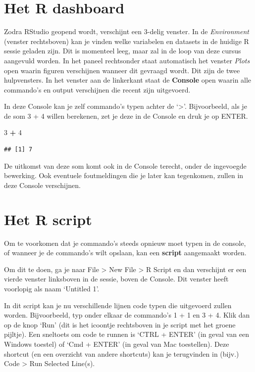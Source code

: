 \documentclass[
]{book}
\newenvironment{Shaded}{\begin{snugshade}}{\end{snugshade}}
\newcommand{\DecValTok}[1]{\textcolor[rgb]{0.00,0.00,0.81}{#1}}
\newcommand{\SpecialCharTok}[1]{\textcolor[rgb]{0.81,0.36,0.00}{\textbf{#1}}}
\begin{document}
\hypertarget{het-r-dashboard}{%
\section{Het R dashboard}\label{het-r-dashboard}}

Zodra RStudio geopend wordt, verschijnt een 3-delig venster. In de \emph{Environment} (venster rechtsboven) kan je vinden welke variabelen en datasets in de huidige R sessie geladen zijn. Dit is momenteel leeg, maar zal in de loop van deze cursus aangevuld worden. In het paneel rechtsonder staat automatisch het venster \emph{Plots} open waarin figuren verschijnen wanneer dit gevraagd wordt. Dit zijn de twee hulpvensters. In het venster aan de linkerkant staat de \textbf{Console} open waarin alle commando's en output verschijnen die recent zijn uitgevoerd.

In deze Console kan je zelf commando's typen achter de `\textgreater{}'. Bijvoorbeeld, als je de som 3 + 4 willen berekenen, zet je deze in de Console en druk je op ENTER.

\begin{Shaded}
\begin{Highlighting}[]
\DecValTok{3} \SpecialCharTok{+} \DecValTok{4}
\end{Highlighting}
\end{Shaded}

\begin{verbatim}
## [1] 7
\end{verbatim}

De uitkomst van deze som komt ook in de Console terecht, onder de ingevoegde bewerking. Ook eventuele foutmeldingen die je later kan tegenkomen, zullen in deze Console verschijnen.

\hypertarget{het-r-script}{%
\section{Het R script}\label{het-r-script}}

Om te voorkomen dat je commando's steeds opnieuw moet typen in de console, of
wanneer je de commando's wilt opslaan, kan een \textbf{script} aangemaakt worden.

Om dit te doen, ga je naar File \textgreater{} New File \textgreater{} R Script en dan verschijnt er een vierde
venster linksboven in de sessie, boven de Console. Dit venster heeft voorlopig als naam `Untitled 1'.

In dit script kan je nu verschillende lijnen code typen die uitgevoerd zullen worden. Bijvoorbeeld, typ onder elkaar de commando's 1 + 1 en 3 + 4. Klik dan op de knop `Run' (dit is het icoontje rechtsboven in je script met het groene pijltje). Een sneltoets om code te runnen is `CTRL + ENTER' (in geval van een Windows toestel) of `Cmd + ENTER' (in geval van Mac toestellen). Deze shortcut (en een overzicht van andere shortcuts) kan je terugvinden in (bijv.) Code \textgreater{} Run Selected Line(s).
\end{document}
